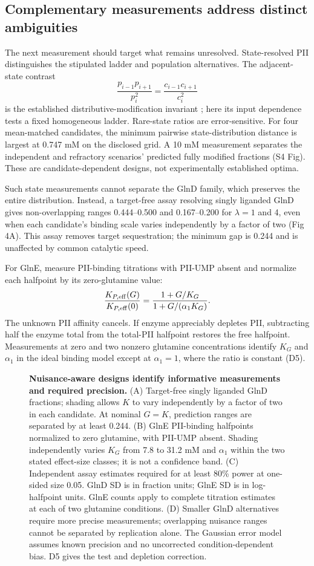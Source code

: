 \documentclass[10pt,letterpaper]{article}
\begin{document}
\subsection*{Complementary measurements address distinct ambiguities}

The next measurement should target what remains unresolved. State-resolved PII distinguishes the stipulated ladder and population alternatives. The adjacent-state contrast
\[
 \frac{p_{i-1}p_{i+1}}{p_i^2}=\frac{c_{i-1}c_{i+1}}{c_i^2}
\]
is the established distributive-modification invariant \cite{r76}; here its input dependence tests a fixed homogeneous ladder. Rare-state ratios are error-sensitive. For four mean-matched candidates, the minimum pairwise state-distribution distance is largest at 0.747 mM on the disclosed grid. A 10 mM measurement separates the independent and refractory scenarios' predicted fully modified fractions (S4 Fig). These are candidate-dependent designs, not experimentally established optima.

Such state measurements cannot separate the GlnD family, which preserves the entire distribution. Instead, a target-free assay resolving singly liganded GlnD gives non-overlapping ranges 0.444--0.500 and 0.167--0.200 for $\lambda=1$ and 4, even when each candidate's binding scale varies independently by a factor of two (Fig 4A). This assay removes target sequestration; the minimum gap is 0.244 and is unaffected by common catalytic speed.

For GlnE, measure PII-binding titrations with PII-UMP absent and normalize each halfpoint by its zero-glutamine value:
\[
 \frac{K_{P,\rm eff}(G)}{K_{P,\rm eff}(0)}
 =\frac{1+G/K_G}{1+G/(\alpha_1K_G)}.
\]
The unknown PII affinity cancels. If enzyme appreciably depletes PII, subtracting half the enzyme total from the total-PII halfpoint restores the free halfpoint. Measurements at zero and two nonzero glutamine concentrations identify $K_G$ and $\alpha_1$ in the ideal binding model except at $\alpha_1=1$, where the ratio is constant (D5).

\begin{figure}[!ht]\centering
\caption{\textbf{Nuisance-aware designs identify informative measurements and required precision.} (A) Target-free singly liganded GlnD fractions; shading allows $K$ to vary independently by a factor of two in each candidate. At nominal $G=K$, prediction ranges are separated by at least 0.244. (B) GlnE PII-binding halfpoints normalized to zero glutamine, with PII-UMP absent. Shading independently varies $K_G$ from 7.8 to 31.2 mM and $\alpha_1$ within the two stated effect-size classes; it is not a confidence band. (C) Independent assay estimates required for at least 80\% power at one-sided size 0.05. GlnD SD is in fraction units; GlnE SD is in log-halfpoint units. GlnE counts apply to complete titration estimates at each of two glutamine conditions. (D) Smaller GlnD alternatives require more precise measurements; overlapping nuisance ranges cannot be separated by replication alone. The Gaussian error model assumes known precision and no uncorrected condition-dependent bias. D5 gives the test and depletion correction.}
\end{figure}
\end{document}
